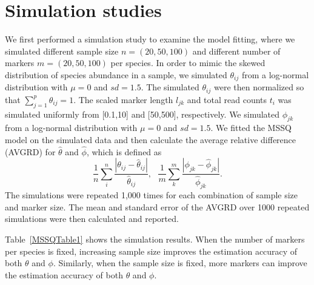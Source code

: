 \section{Simulation studies}
We  first performed  a simulation study to examine the model fitting, where we simulated different sample size $n=(20,50,100)$ and different number of markers $m=(20,50,100)$ per species. In order to mimic the skewed distribution of species abundance in a sample, we simulated $\theta_{ij}$ from a log-normal distribution with $\mu=0$ and $sd=1.5$. The simulated $\theta_{ij}$ were then normalized so that    $\sum_{j=1}^{p} \theta_{ij} = 1$. The scaled marker length $l_{jk}$ and total read counts $t_i$ was simulated uniformly from [0.1,10] and [50,500], respectively. We simulated $\phi_{jk}$ from a log-normal distribution with $\mu=0$ and $sd= 1.5$. We fitted the MSSQ model on the simulated data and  then calculate the average relative difference (AVGRD) for  $\hat\theta$ and $\hat\phi$, which is defined as
$$\frac{1}{n}\sum_i^n \frac{|\theta_{ij}-\hat{\theta}_{ij}|}{\hat{\theta}_{ij}}, \mbox{  }
\frac{1}{m}\sum_k^m \frac{|\phi_{jk}-\hat{\phi}_{jk}|}{\hat{\phi}_{jk}}.
$$ 
The simulations were repeated 1,000 times for each combination of sample size and marker size. The mean and standard error of the AVGRD over 1000 repeated simulations were then calculated and reported.

Table~\ref{MSSQTable1} shows the simulation results. When the number of markers per species is fixed, increasing  sample size improves the estimation accuracy of both $\theta$ and $\phi$. Similarly, when the sample size is fixed, more markers can improve the estimation accuracy of both $\theta$ and $\phi$.

